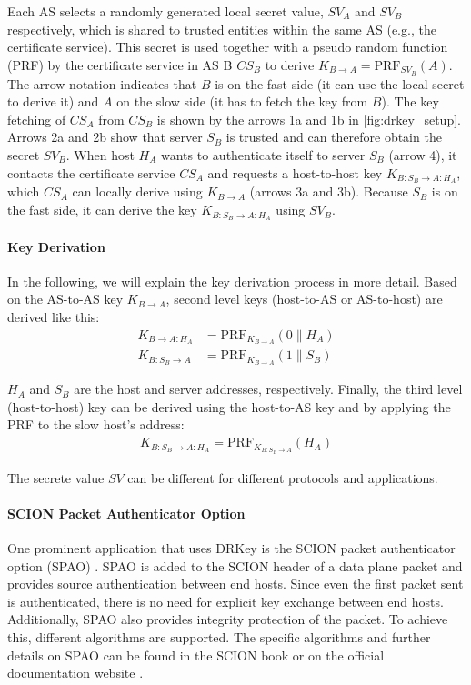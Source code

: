 Each AS selects a randomly generated local secret value, $SV_A$ and $SV_B$ respectively, which is shared to trusted entities within the same AS (e.g., the certificate service).
This secret is used together with a pseudo random function (PRF) by the certificate service in AS B $CS_B$ to derive $K_{B \rightarrow A} = \text{PRF}_{SV_B}(A)$.
The arrow notation indicates that $B$ is on the fast side (it can use the local secret to derive it) and $A$ on the slow side (it has to fetch the key from $B$).
The key fetching of $CS_A$ from $CS_B$ is shown by the arrows 1a and 1b in \cref{fig:drkey_setup}.
Arrows 2a and 2b show that server $S_B$ is trusted and can therefore obtain the secret $SV_B$.
When host $H_A$ wants to authenticate itself to server $S_B$ (arrow 4), it contacts the certificate service $CS_A$ and requests a host-to-host key $K_{B:S_B \rightarrow A:H_A}$, which $CS_A$ can locally derive using $K_{B \rightarrow A}$ (arrows 3a and 3b).
Because $S_B$ is on the fast side, it can derive the key $K_{B:S_B \rightarrow A:H_A}$ using $SV_B$.

\paragraph{Key Derivation}
In the following, we will explain the key derivation process in more detail.
Based on the AS-to-AS key $K_{B \rightarrow A}$, second level keys (host-to-AS or AS-to-host) are derived like this:
\begin{align*}
K_{B \rightarrow A:H_A} &= \text{PRF}_{K_{B \rightarrow A}}(0 \parallel H_A) \\
K_{B:S_B \rightarrow A} &= \text{PRF}_{K_{B \rightarrow A}}(1 \parallel S_B)
\end{align*}

$H_A$ and $S_B$ are the host and server addresses, respectively.
Finally, the third level (host-to-host) key can be derived using the host-to-AS key and by applying the PRF to the slow host's address:
\begin{align*}
    K_{B:S_B \rightarrow A:H_A} = \text{PRF}_{K_{B:S_B \rightarrow A}}(H_A)
\end{align*}

The secrete value $SV$ can be different for different protocols and applications.

\paragraph{SCION Packet Authenticator Option}
\label{sec:spao}
One prominent application that uses DRKey is the SCION packet authenticator option (SPAO) \cite[Section 3.3]{Perrig2022}.
SPAO is added to the SCION header of a data plane packet and provides source authentication between end hosts.
Since even the first packet sent is authenticated, there is no need for explicit key exchange between end hosts.
Additionally, SPAO also provides integrity protection of the packet.
To achieve this, different algorithms are supported.
The specific algorithms and further details on SPAO can be found in the SCION book or on the official documentation website \cite{anapayaSCIONPacket}.


